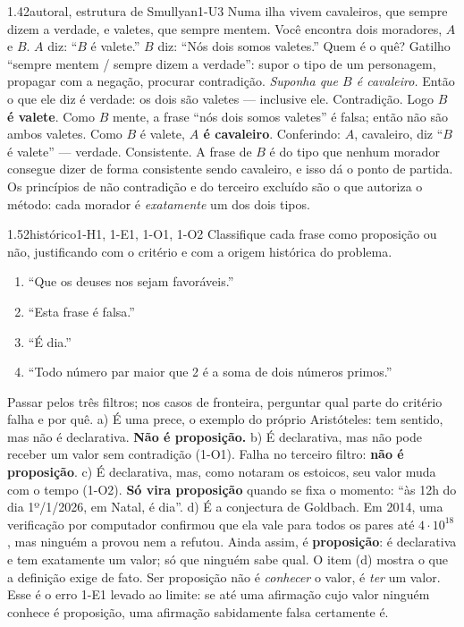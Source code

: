 \begin{exemplo}{1.4}{2}{autoral, estrutura de Smullyan}{1-U3}\label{ex:1.4}
Numa ilha vivem cavaleiros, que sempre dizem a verdade, e valetes, que sempre mentem. Você encontra dois moradores, $A$ e $B$.
$A$ diz: \enquote{$B$ é valete.} \quad $B$ diz: \enquote{Nós dois somos valetes.}
Quem é o quê?
\plano Gatilho \enquote{sempre mentem / sempre dizem a verdade}: supor o tipo de um personagem, propagar com a negação, procurar contradição.
\resolucao
\emph{Suponha que $B$ é cavaleiro.} Então o que ele diz é verdade: os dois são valetes — inclusive ele. Contradição. Logo \textbf{$B$ é valete}.
Como $B$ mente, a frase \enquote{nós dois somos valetes} é falsa; então não são ambos valetes. Como $B$ é valete, \textbf{$A$ é cavaleiro}.
Conferindo: $A$, cavaleiro, diz \enquote{$B$ é valete} — verdade. Consistente.
\comentario A frase de $B$ é do tipo que nenhum morador consegue dizer de forma consistente sendo cavaleiro, e isso dá o ponto de partida. Os princípios de não contradição e do terceiro excluído são o que autoriza o método: cada morador é \emph{exatamente} um dos dois tipos.
\end{exemplo}

\begin{exemplo}{1.5}{2}{histórico}{1-H1, 1-E1, 1-O1, 1-O2}\label{ex:1.5}
Classifique cada frase como proposição ou não, justificando com o critério e com a origem histórica do problema.
\begin{enumerate}[label=\alph*)]
  \item \enquote{Que os deuses nos sejam favoráveis.}
  \item \enquote{Esta frase é falsa.}
  \item \enquote{É dia.}
  \item \enquote{Todo número par maior que 2 é a soma de dois números primos.}
\end{enumerate}
\plano Passar pelos três filtros; nos casos de fronteira, perguntar qual parte do critério falha e por quê.
\resolucao
a) É uma prece, o exemplo do próprio Aristóteles: tem sentido, mas não é declarativa. \textbf{Não é proposição.}
b) É declarativa, mas não pode receber um valor sem contradição (1-O1). Falha no terceiro filtro: \textbf{não é proposição}.
c) É declarativa, mas, como notaram os estoicos, seu valor muda com o tempo (1-O2). \textbf{Só vira proposição} quando se fixa o momento: \enquote{às 12h do dia 1º/1/2026, em Natal, é dia}.
d) É a conjectura de Goldbach. Em 2014, uma verificação por computador confirmou que ela vale para todos os pares até $4\cdot10^{18}$, mas ninguém a provou nem a refutou. Ainda assim, é \textbf{proposição}: é declarativa e tem exatamente um valor; só que ninguém sabe qual.
\comentario O item (d) mostra o que a definição exige de fato. Ser proposição não é \emph{conhecer} o valor, é \emph{ter} um valor. Esse é o erro 1-E1 levado ao limite: se até uma afirmação cujo valor ninguém conhece é proposição, uma afirmação sabidamente falsa certamente é.
\end{exemplo}

